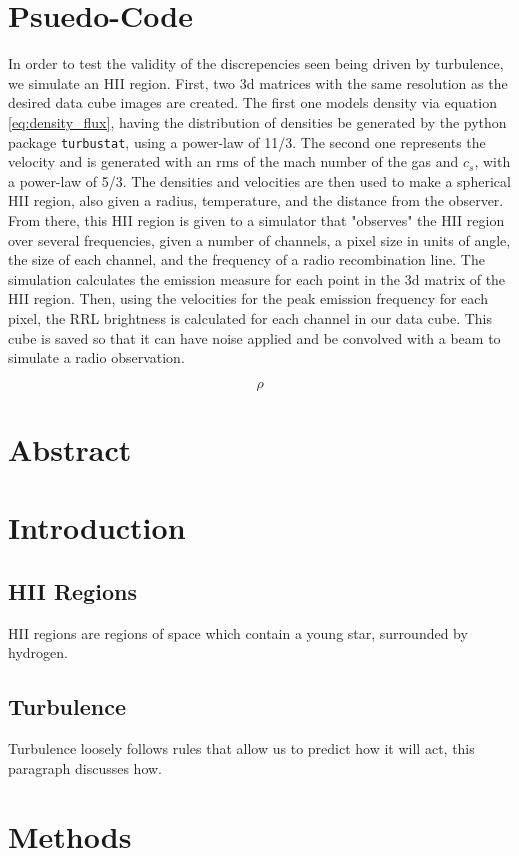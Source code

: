 \documentclass{article}
\def\code#1{\texttt{#1}}
\begin{document}
\section{Psuedo-Code}
In order to test the validity of the discrepencies seen being driven by turbulence, we simulate an HII region. First, two 3d matrices with the same resolution as the desired data cube images are created. The first one models density via equation \ref{eq:density_flux}, having the distribution of densities be generated by the python package \code{turbustat}, using a power-law of 11/3. The second one represents the velocity and is generated with an rms of the mach number of the gas and $c_s$, with a power-law of 5/3. The densities and velocities are then used to make a spherical HII region, also given a radius, temperature, and the distance from the observer. From there, this HII region is given to a simulator that "observes" the HII region over several frequencies, given a number of channels, a pixel size in units of angle, the size of each channel, and the frequency of a radio recombination line. The simulation calculates the emission measure for each point in the 3d matrix of the HII region. Then, using the velocities for the peak emission frequency for each pixel, the RRL brightness is calculated for each channel in our data cube. This cube is saved so that it can have noise applied and be convolved with a beam to simulate a radio observation.

\begin{equation}
  \rho
  \label{eq:density_flux}
\end{equation}

\section{Abstract}
\section{Introduction}
\subsection{HII Regions}
HII regions are regions of space which contain a young star, surrounded by hydrogen.
\subsection{Turbulence}
Turbulence loosely follows rules that allow us to predict how it will act, this paragraph discusses how.
\section{Methods}
\end{document}

